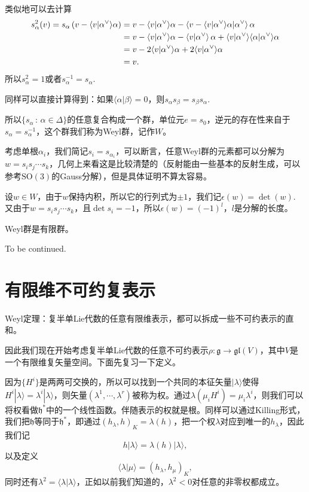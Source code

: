 \documentclass[10pt]{article}
\newcommand{\lag}{{\mathfrak{g}}}
\begin{document}
\para 类似地可以去计算
\begin{align*}
	s_\alpha^2(v)=s_\alpha\left(v-\langle v|\alpha^\vee\rangle\alpha\right)&=v-\langle v|\alpha^\vee\rangle\alpha-\left\langle v-\langle v|\alpha^\vee\rangle\alpha\large|\alpha^\vee\right\rangle\alpha\\
	&=v-\langle v|\alpha^\vee\rangle\alpha-\left\langle v\large|\alpha^\vee\right\rangle\alpha+\langle v|\alpha^\vee\rangle\langle\alpha|\alpha^\vee\rangle\alpha\\
	&=v-2\langle v|\alpha^\vee\rangle\alpha+2\langle v|\alpha^\vee\rangle\alpha\\
	&=v.
\end{align*}
所以$s_\alpha^2=1$或者$s_\alpha^{-1}=s_\alpha$.

同样可以直接计算得到：如果$\langle \alpha|\beta\rangle=0$，则$s_\alpha s_\beta=s_\beta s_\alpha$.

\para 所以$\{s_\alpha\,:\, \alpha\in \Delta\}$的任意复合构成一个群，单位元$e=s_0$，逆元的存在性来自于$s_\alpha=s_\alpha^{-1}$，这个群我们称为Weyl群，记作$W$。

考虑单根$\alpha_i$，我们简记$s_i=s_{\alpha_i}$，可以断言，任意Weyl群的元素都可以分解为$w=s_is_j\cdots s_k$，几何上来看这是比较清楚的（反射能由一些基本的反射生成，可以参考$\mathrm{SO}(3)$的Gauss分解），但是具体证明不算太容易。

\para 设$w\in W$，由于$w$保持内积，所以它的行列式为$\pm 1$，我们记$\epsilon(w)=\det(w)$. 又由于$w=s_is_j\cdots s_k$，且$\det s_i=-1$，所以$\epsilon(w)=(-1)^l$，$l$是分解的长度。

\pro Weyl群是有限群。

To be continued.

\section{有限维不可约复表示}

\theo Weyl定理：复半单Lie代数的任意有限维表示，都可以拆成一些不可约表示的直和。

因此我们现在开始考虑复半单Lie代数的任意不可约表示$\rho:\lag\to \mathfrak{gl}(V)$，其中$V$是一个有限维复矢量空间。下面先复习一下定义。

\para 因为$\{H^i\}$是两两可交换的，所以可以找到一个共同的本征矢量$|\lambda\rangle$使得$H^i|\lambda\rangle=\lambda^i|\lambda\rangle$，则矢量$(\lambda^1,\cdots,\lambda^r)$被称为权。通过$\lambda(\mu_iH^i)=\mu_i\lambda^i$，则我们可以将权看做$\mathfrak{h}^*$中的一个线性函数。伴随表示的权就是根。同样可以通过Killing形式，我们把$\mathfrak{h}$等同于$\mathfrak{h}^*$，即通过$(h_\lambda,h)_K=\lambda(h)$，把一个权$\lambda$对应到唯一的$h_\lambda$，因此我们记
\[
	h|\lambda\rangle=\lambda(h)|\lambda\rangle,
\]
以及定义
\[
	\langle \lambda|\mu\rangle=(h_\lambda,h_\mu)_K,
\]
同时还有$\lambda^2=\langle \lambda|\lambda\rangle$，正如以前我们知道的，$\lambda^2<0$对任意的非零权都成立。
\end{document}
